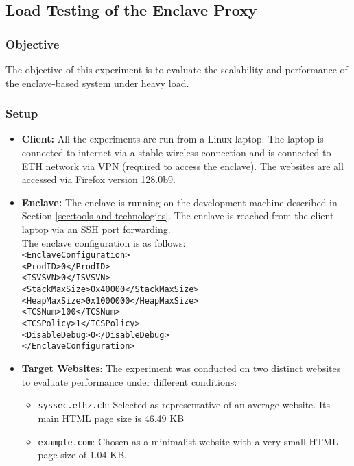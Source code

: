\clearpage
\subsection{Load Testing of the Enclave Proxy} \label{experiment-2}
\subsubsection{Objective}
The objective of this experiment is to evaluate the scalability and performance of the enclave-based system under heavy load.

\subsubsection{Setup}
\begin{itemize}
    \item \textbf{Client:} All the experiments are run from a Linux laptop. The laptop is connected to internet via a stable wireless connection and is connected to ETH network via VPN (required to access the enclave). The websites are all accessed via Firefox version 128.0b9.
    \item \textbf{Enclave:} The enclave is running on the development machine described in Section \ref{sec:tools-and-technologies}. The enclave is reached from the client laptop via an SSH port forwarding. \\The enclave configuration is as follows:\\
    \texttt{<EnclaveConfiguration>\\
        <ProdID>0</ProdID>\\
        <ISVSVN>0</ISVSVN>\\
        <StackMaxSize>0x40000</StackMaxSize>\\
        <HeapMaxSize>0x1000000</HeapMaxSize>\\
        <TCSNum>100</TCSNum>\\
        <TCSPolicy>1</TCSPolicy>\\
        <DisableDebug>0</DisableDebug>\\
    </EnclaveConfiguration>}
    \item \textbf{Target Websites}: The experiment was conducted on two distinct websites to evaluate performance under different conditions:
    \begin{itemize}
        \item \texttt{syssec.ethz.ch}: Selected as representative of an average website. Its main HTML page size is 46.49 KB
        \item \texttt{example.com}: Chosen as a minimalist website with a very small HTML page size of 1.04 KB.

\end{itemize}
\end{itemize}
